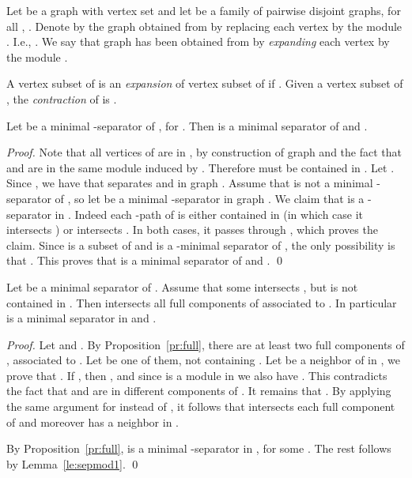 \documentclass{llncs}
\begin{document}
Let  be a graph with vertex set  and let  be a family of pairwise disjoint graphs, for all , . Denote by  the graph obtained from  by replacing each vertex  by the module . I.e., . We say that graph  has been obtained from  by \emph{expanding} each vertex  by the module .

A vertex subset  of  is an \emph{expansion} of vertex subset  of  if . Given a vertex subset  of , the \emph{contraction} of  is . 

\begin{lemma}\label{le:sepmod1}
Let  be a minimal -separator of , for . Then  is a minimal separator of  and . 
\end{lemma}
\begin{proof}
Note that all vertices of  are in , by construction of graph  and the fact that  and  are in the same module induced by . Therefore  must be contained in . Let . Since , we have that  separates  and  in graph . Assume that  is not a minimal -separator of , so let  be a minimal -separator in graph . We claim that  is a -separator in . Indeed each -path of  is either contained in  (in which case it intersects ) or intersects . In both cases, it passes through , which proves the claim. Since  is a subset of  and  is a -minimal separator of , the only possibility is that . This proves that  is a minimal separator of 
 and .
\qed
\end{proof}

\begin{lemma}\label{le:sepmod}
Let  be a minimal separator of . Assume that some  intersects , but is not contained in .
Then  intersects all full components of  associated to . In particular  is a minimal separator in  and 
.
\end{lemma}
\begin{proof}
Let  and . 
By Proposition~\ref{pr:full}, there are at least two full  components of , associated to . Let  be one of them, not containing . Let  be a neighbor of  in , we prove that . If , then , and since  is a module in  we also have . This contradicts the fact that  and  are in different components of . It remains that  . By applying the same argument for  instead of , it follows that  intersects each full component  of  and moreover  has a neighbor in . 

By Proposition~\ref{pr:full},  is a minimal -separator in , for some . The rest follows by Lemma~\ref{le:sepmod1}.
\qed
\end{proof}
\end{document}
